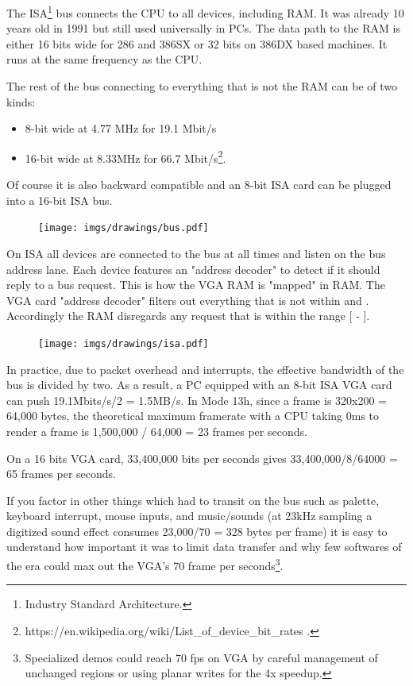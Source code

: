 \documentclass[book.tex]{subfiles}
\begin{document}
The ISA\footnote{Industry Standard Architecture.} bus connects the CPU to all devices, including RAM. It was already 10 years old in 1991 but still used universally in PCs. The data path to the RAM is either 16 bits wide for 286 and 386SX or 32 bits on 386DX based machines. It runs at the same frequency as the CPU.\\
\par
The rest of the bus connecting to everything that is not the RAM can be of two kinds:
\begin{itemize}
\item 8-bit wide at 4.77 MHz  for 19.1 Mbit/s
\item 16-bit wide at 8.33MHz for 66.7 Mbit/s\footnote{https://en.wikipedia.org/wiki/List\_of\_device\_bit\_rates .}.
\end{itemize}
Of course it is also backward compatible and an 8-bit ISA card can be plugged into a 16-bit ISA bus.\\
\par
\begin{figure}[H]
\centering
      \texttt{[image: imgs/drawings/bus.pdf]}
\end{figure}
\par
{} On ISA all devices are connected to the bus at all times and listen on the bus address lane. Each device features an "address decoder" to detect if it should reply to a bus request. This is how the VGA RAM is "mapped" in RAM. The VGA card "address decoder"  filters out everything that is not within  and . Accordingly the RAM disregards any request that is within the range [ - ].\\
\par
 \begin{figure}[H]
\centering
\texttt{[image: imgs/drawings/isa.pdf]}
\end{figure}

\par
 In practice, due to packet overhead and interrupts, the effective bandwidth of the bus is divided by two. As a result, a PC equipped with an 8-bit ISA VGA card can push 19.1Mbits/s/2 = 1.5MB/s. In Mode 13h, since a frame is 320x200 = 64,000 bytes, the theoretical maximum framerate with a CPU taking 0ms to render a frame is 1,500,000 / 64,000 = 23 frames per seconds.\\
 \par
 On a 16 bits VGA card, 33,400,000 bits per seconds gives 33,400,000/8/64000 = 65 frames per seconds.\\
 \par
 If you factor in other things which had to transit on the bus such as palette, keyboard interrupt, mouse inputs, and music/sounds (at 23kHz sampling a digitized sound effect consumes 23,000/70 = 328 bytes per frame) it is easy to understand how important it was to limit data transfer and why few softwares of the era could max out the VGA's 70 frame per seconds\footnote{Specialized demos could reach 70 fps on VGA by careful management of unchanged regions or using planar writes for the 4x speedup.}.
\end{document}
